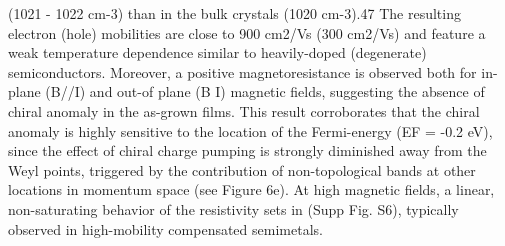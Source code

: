 (1021 - 1022 cm-3) than in the bulk crystals (1020 cm-3).47 The resulting electron (hole) mobilities 
are close to 900 cm2/Vs (300 cm2/Vs) and feature a weak temperature dependence similar to heavily-doped 
(degenerate) semiconductors.  Moreover, a positive magnetoresistance is observed both for in-plane (B//I) 
and out-of plane (B I) magnetic fields, suggesting the absence of chiral anomaly in the as-grown films.  
This result corroborates that the chiral anomaly is highly sensitive to the location of the Fermi-energy 
(EF = -0.2 eV), since the effect of chiral charge pumping is strongly diminished away from the Weyl 
points, triggered by the contribution of non-topological bands at other locations in momentum space 
(see Figure 6e).  At high magnetic fields, a linear, non-saturating behavior of the resistivity sets 
in (Supp Fig. S6), typically observed in high-mobility compensated semimetals.  